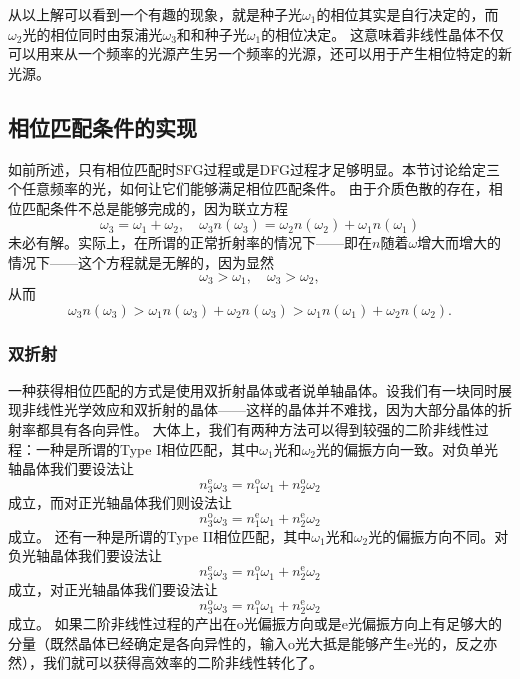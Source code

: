 从以上解可以看到一个有趣的现象，就是种子光$\omega_1$的相位其实是自行决定的，而$\omega_2$光的相位同时由泵浦光$\omega_3$和和种子光$\omega_1$的相位决定。
这意味着非线性晶体不仅可以用来从一个频率的光源产生另一个频率的光源，还可以用于产生相位特定的新光源。

\subsection{相位匹配条件的实现}

如前所述，只有相位匹配时SFG过程或是DFG过程才足够明显。本节讨论给定三个任意频率的光，如何让它们能够满足相位匹配条件。
由于介质色散的存在，相位匹配条件不总是能够完成的，因为联立方程
\[
    \omega_3 = \omega_1 + \omega_2, \quad \omega_3 n(\omega_3) = \omega_2 n(\omega_2) + \omega_1 n(\omega_1)
\]
未必有解。实际上，在所谓的正常折射率的情况下——即在$n$随着$\omega$增大而增大的情况下——这个方程就是无解的，因为显然
\[
    \omega_3 > \omega_1, \quad \omega_3 > \omega_2,
\]
从而
\[
    \omega_3 n(\omega_3) > \omega_1 n(\omega_3) + \omega_2 n(\omega_3) > \omega_1 n(\omega_1) + \omega_2 n(\omega_2).
\]

\subsubsection{双折射}

一种获得相位匹配的方式是使用双折射晶体或者说单轴晶体。设我们有一块同时展现非线性光学效应和双折射的晶体——这样的晶体并不难找，因为大部分晶体的折射率都具有各向异性。
大体上，我们有两种方法可以得到较强的二阶非线性过程：一种是所谓的Type I相位匹配，其中$\omega_1$光和$\omega_2$光的偏振方向一致。对负单光轴晶体我们要设法让
\begin{equation}
    n^\text{e}_3 \omega_3 = n^\text{o}_1 \omega_1 + n^\text{o}_2 \omega_2
\end{equation}
成立，而对正光轴晶体我们则设法让
\begin{equation}
    n^\text{o}_3 \omega_3 = n^\text{e}_1 \omega_1 + n^\text{e}_2 \omega_2
\end{equation}
成立。
还有一种是所谓的Type II相位匹配，其中$\omega_1$光和$\omega_2$光的偏振方向不同。对负光轴晶体我们要设法让
\begin{equation}
    n^\text{e}_3 \omega_3 = n^\text{o}_1 \omega_1 + n^\text{e}_2 \omega_2
\end{equation}
成立，对正光轴晶体我们要设法让
\begin{equation}
    n^\text{o}_3 \omega_3 = n^\text{o}_1 \omega_1 + n^\text{e}_2 \omega_2
\end{equation}
成立。
如果二阶非线性过程的产出在o光偏振方向或是e光偏振方向上有足够大的分量（既然晶体已经确定是各向异性的，输入o光大抵是能够产生e光的，反之亦然），我们就可以获得高效率的二阶非线性转化了。


